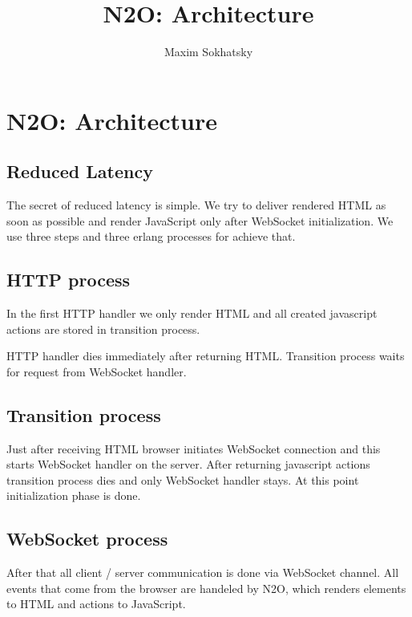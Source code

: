 \documentclass[11pt]{article}
\begin{document}
\title{N2O: Architecture}
\author{Maxim Sokhatsky}

\paragraph{}
\section*{N2O: Architecture}

\subsection*{Reduced Latency}
The secret of reduced latency is simple. We try to deliver rendered HTML
as soon as possible and render JavaScript only after WebSocket initialization.
We use three steps and three erlang processes for achieve that.


\subsection*{HTTP process}
In the first HTTP handler we only render HTML and all created javascript actions are stored in transition process.


HTTP handler dies immediately after returning HTML. Transition process
waits for request from WebSocket handler.

\subsection*{Transition process}
Just after receiving HTML browser initiates WebSocket connection
and this starts WebSocket handler on the server. After returning
javascript actions transition process dies and only WebSocket handler stays.
At this point initialization phase is done.

\subsection*{WebSocket process}
After that all client / server communication is done via WebSocket channel.
All events that come from the browser are handeled by N2O, which renders elements
to HTML and actions to JavaScript.







\end{document}
